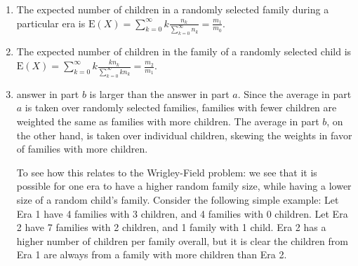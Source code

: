 \begin{enumerate}[label=(\alph*)]
\item The expected number of children in a randomly selected family during a
particular era is $\text{E}(X) = \sum_{k=0}^{\infty}k\frac{n_{k}}{\sum_{k=0}^
{\infty}n_{k}} = \frac{m_{1}}{m_{0}}$.

\item The expected number of children in the family of a randomly selected child
is $\text{E}(X) = \sum_{k=0}^{\infty}k\frac{kn_{k}}{\sum_{k=0}^{\infty}kn_{k}} =
\frac{m_{2}}{m_{1}}$.

\item answer in part $b$ is larger than the answer in part $a$. Since the
average in part $a$ is taken over randomly selected families, families with
fewer children are weighted the same as families with more children. The average
in part $b$, on the other hand, is taken over individual children, skewing the
weights in favor of families with more children.

To see how this relates to the Wrigley-Field problem: we see that it is possible for one era to have a higher random family size, while having a lower size of a random child's family. Consider the following simple example: Let Era 1 have 4 families with 3 children, and 4 families with 0 children. Let Era 2 have 7 families with 2 children, and 1 family with 1 child. Era 2 has a higher number of children per family overall, but it is clear the children from Era 1 are always from a family with more children than Era 2. 
\end{enumerate}
